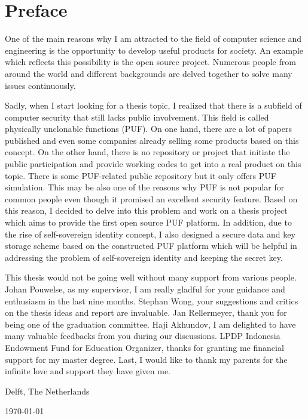 \chapter*{Preface}
One of the main reasons why I am attracted to the field of computer science and engineering is the opportunity to develop useful products for society. An example which reflects this possibility is the open source project. Numerous people from around the world and different backgrounds are delved together to solve many issues continuously.

Sadly, when I start looking for a thesis topic, I realized that there is a subfield of computer security that still lacks public involvement. This field is called physically unclonable functions (PUF). On one hand, there are a lot of papers published and even some companies already selling some products based on this concept. On the other hand, there is no repository or project that initiate the public participation and provide working codes to get into a real product on this topic. There is some PUF-related public repository but it only offers PUF simulation. This may be also one of the reasons why PUF is not popular for common people even though it promised an excellent security feature. Based on this reason, I decided to delve into this problem and work on a thesis project which aims to provide the first open source PUF platform. In addition, due to the rise of self-sovereign identity concept, I also designed a secure data and key storage scheme based on the constructed PUF platform which will be helpful in addressing the problem of self-sovereign identity and keeping the secret key.
\vspace{1\baselineskip}

\noindent
This thesis would not be going well without many support from various people. Johan Pouwelse, as my supervisor, I am really gladful for your guidance and enthusiasm in the last nine months.  Stephan Wong, your suggestions and critics on the thesis ideas and report are invaluable. Jan Rellermeyer, thank you for being one of the graduation committee. Haji Akhundov, I am delighted to have many valuable feedbacks from you during our discussions.
LPDP Indonesia Endowment Fund for Education Organizer, thanks for granting me financial support for my master degree. Last, I would like to thank my parents for the infinite love and support they have given me.

\vspace{1\baselineskip}

\noindent
\reportAuthor

\vspace{1\baselineskip}

\noindent
Delft, The Netherlands

\noindent
\today
